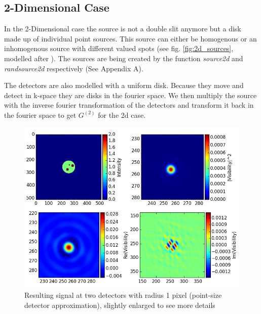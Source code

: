\documentclass{article}
\begin{document}
\subsection{2-Dimensional Case}
In the 2-Dimensional case the source is not a double slit anymore but a disk made up of individual point sources. This source can either be homogenous or an inhomogenous source with different valued spots (see fig. \ref{fig:2d_sources}, modelled after \cite{wentz2014}). The sources are being created by the function \textit{source2d} and \textit{randsource2d} respectively (See Appendix A).

The detectors are also modelled with a uniform disk. Because they move and detect in k-space they are disks in the fourier space. We then multiply the source with the inverse fourier transformation of the detectors and transform it back in the fourier space to get \(G^{(2)}\) for the 2d case. 


\begin{figure}[ht!]
	\centering
    \includegraphics[scale=0.51]{figure_results_ptsized}
    \caption{Resulting signal at two detectors with radius 1 pixel (point-size detector approximation), slightly enlarged to see more details \label{fig:result_1px}
 }
\end{figure}
\end{document}
